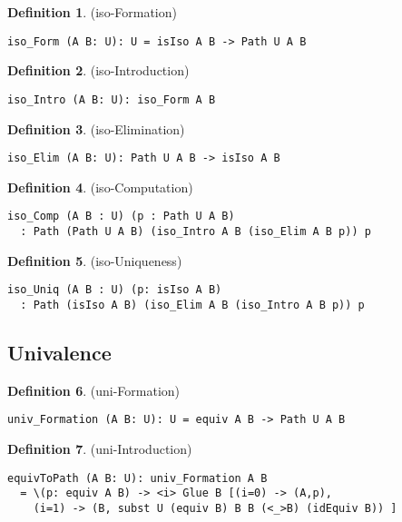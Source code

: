 \documentclass{article}
\theoremstyle{definition}
\newtheorem{definition}{Definition}
\begin{document}
\begin{definition} (iso-Formation)
\begin{lstlisting}
iso_Form (A B: U): U = isIso A B -> Path U A B
\end{lstlisting}
\end{definition}

\begin{definition} (iso-Introduction)
\begin{lstlisting}
iso_Intro (A B: U): iso_Form A B
\end{lstlisting}
\end{definition}

\begin{definition} (iso-Elimination)
\begin{lstlisting}
iso_Elim (A B: U): Path U A B -> isIso A B
\end{lstlisting}
\end{definition}

\begin{definition} (iso-Computation)
\begin{lstlisting}
iso_Comp (A B : U) (p : Path U A B)
  : Path (Path U A B) (iso_Intro A B (iso_Elim A B p)) p
\end{lstlisting}
\end{definition}

\begin{definition} (iso-Uniqueness)
\begin{lstlisting}
iso_Uniq (A B : U) (p: isIso A B)
  : Path (isIso A B) (iso_Elim A B (iso_Intro A B p)) p
\end{lstlisting}
\end{definition}

\newpage
\subsection{Univalence}

\begin{definition} (uni-Formation)
\begin{lstlisting}
univ_Formation (A B: U): U = equiv A B -> Path U A B
\end{lstlisting}
\end{definition}

\begin{definition} (uni-Introduction)
\begin{lstlisting}
equivToPath (A B: U): univ_Formation A B
  = \(p: equiv A B) -> <i> Glue B [(i=0) -> (A,p),
    (i=1) -> (B, subst U (equiv B) B B (<_>B) (idEquiv B)) ]
\end{lstlisting}
\end{definition}
\end{document}
